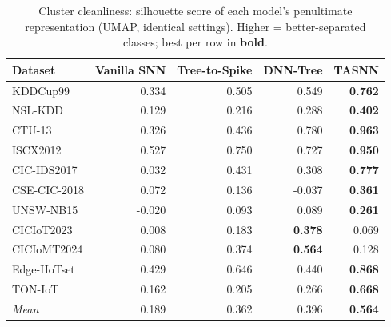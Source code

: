 \begin{table}[t]
\centering
\caption{Cluster cleanliness: silhouette score of each model's penultimate representation (UMAP, identical settings). Higher = better-separated classes; best per row in \textbf{bold}.}
\label{tab:silhouette}
\footnotesize
\begin{tabular}{lrrrr}
\toprule
Dataset & Vanilla SNN & Tree-to-Spike & DNN-Tree & TASNN \\
\midrule
KDDCup99 & 0.334 & 0.505 & 0.549 & \textbf{0.762} \\
NSL-KDD & 0.129 & 0.216 & 0.288 & \textbf{0.402} \\
CTU-13 & 0.326 & 0.436 & 0.780 & \textbf{0.963} \\
ISCX2012 & 0.527 & 0.750 & 0.727 & \textbf{0.950} \\
CIC-IDS2017 & 0.032 & 0.431 & 0.308 & \textbf{0.777} \\
CSE-CIC-2018 & 0.072 & 0.136 & -0.037 & \textbf{0.361} \\
UNSW-NB15 & -0.020 & 0.093 & 0.089 & \textbf{0.261} \\
CICIoT2023 & 0.008 & 0.183 & \textbf{0.378} & 0.069 \\
CICIoMT2024 & 0.080 & 0.374 & \textbf{0.564} & 0.128 \\
Edge-IIoTset & 0.429 & 0.646 & 0.440 & \textbf{0.868} \\
TON-IoT & 0.162 & 0.205 & 0.266 & \textbf{0.668} \\
\midrule
\textit{Mean} & 0.189 & 0.362 & 0.396 & \textbf{0.564} \\
\bottomrule
\end{tabular}
\end{table}
